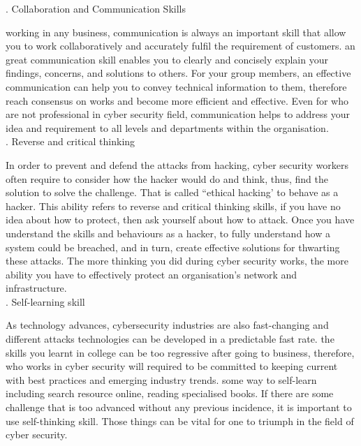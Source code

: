\documentclass[a4paper, 11pt]{report}
\begin{document}
. Collaboration and Communication Skills

working in any business, communication is always an important skill that allow you to work collaboratively and accurately fulfil the requirement of customers. an great communication skill enables you to clearly and concisely explain your findings, concerns, and solutions to others. For your group members, an effective communication can help you to convey technical information to them, therefore reach consensus on works and become more efficient and effective. Even for who are not professional in cyber security field, communication helps to address your idea and requirement to all levels and departments within the organisation.\\

. Reverse and critical thinking

\noindent In order to prevent and defend the attacks from hacking, cyber security workers often require to consider how the hacker would do and think, thus, find the solution to solve the challenge. That is called “ethical hacking’ to behave as a hacker. This ability refers to reverse and critical thinking skills, if you have no idea about how to protect, then ask yourself about how to attack. Once you have understand the skills and behaviours as a hacker, to fully understand how a system could be breached, and in turn, create effective solutions for thwarting these attacks. The more thinking you did during cyber security works, the more ability you have to effectively protect an organisation’s network and infrastructure.\\

. Self-learning skill

\noindent As technology advances, cybersecurity industries are also fast-changing and different attacks technologies can be developed in a predictable fast rate. the skills you learnt in college can be too regressive after going to business, therefore, who works in cyber security will required to be committed to keeping current with best practices and emerging industry trends. some way to self-learn including search resource online, reading specialised books. If there are some challenge that is too advanced without any previous incidence, it is important to use self-thinking skill. Those things can be vital for one to triumph in the field of cyber security.


\end{document}
